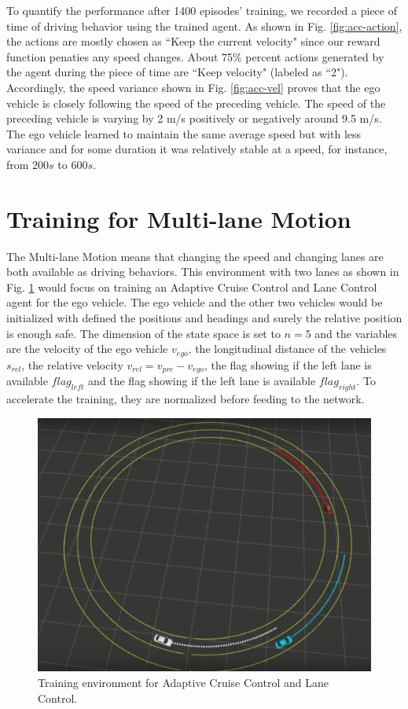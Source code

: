 To quantify the performance after 1400 episodes' training, we recorded a piece of time of driving behavior using the trained agent. As shown in Fig. \ref{fig:acc-action}, the actions are mostly chosen as ``Keep the current velocity" since our reward function penaties any speed changes. About 75\% percent actions generated by the agent during the piece of time are ``Keep velocity" (labeled as ``2"). Accordingly, the speed variance shown in Fig. \ref{fig:acc-vel} proves that the ego vehicle is closely following the speed of the preceding vehicle. The speed of the preceding vehicle is varying by 2 m/s positively or negatively around 9.5 m/s. The ego vehicle learned to maintain the same average speed but with less variance and for some duration it was relatively stable at a speed, for instance, from $200s$ to $600s$.

\section{Training for Multi-lane Motion}

The Multi-lane Motion means that changing the speed and changing lanes are both available as driving behaviors. This environment with two lanes as shown in Fig. \ref{fig:auto-env} would focus on training an Adaptive Cruise Control and Lane Control agent for the ego vehicle. The ego vehicle and the other two vehicles would be initialized with defined the positions and headings and surely the relative position is enough safe. The dimension of the state space is set to $n = 5$ and the variables are the velocity of the ego vehicle $v_{ego}$, the longitudinal distance of the vehicles $s_{rel}$, the relative velocity $v_{rel} = v_{pre} - v_{ego}$, the flag showing if the left lane is available $flag_{left}$ and the flag showing if the left lane is available $flag_{right}$. To accelerate the training, they are normalized before feeding to the network.

\begin{figure}[h]
\centering
\includegraphics[width=1.0\textwidth]{figs/ch5/auto-env}
\caption{Training environment for Adaptive Cruise Control and Lane Control.}
\label{fig:auto-env}
\end{figure}

